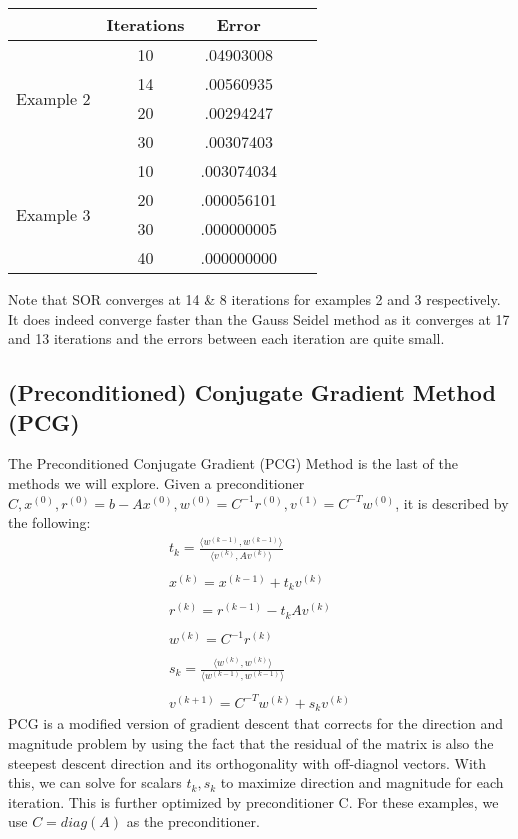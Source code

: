 \documentclass[11pt]{article}	%
\begin{document}
\begin{center}
    \begin{tabular}{||c|c|c|c|c||}
        \hline
        & Iterations & Error \\ [.35em]
        \hline
        \multirow{4}{5em}{Example 2} & 10 & .04903008 \\ [.25em]
        & 14 & .00560935 \\ [.25em]
        & 20 & .00294247 \\ [.25em]
        & 30 & .00307403 \\ [.25em]
        \hline
        \multirow{4}{5em}{Example 3} & 10 & .003074034 \\ [.25em]
        & 20 & .000056101 \\ [.25em]
        & 30 & .000000005 \\ [.25em]
        & 40 & .000000000 \\ [.25em]
        \hline
    \end{tabular}
\end{center}

Note that SOR converges at 14 \& 8 iterations for examples 2 and 3 respectively. It does indeed converge faster than the Gauss Seidel method as it converges at 17 and 13 iterations and the errors between each iteration are quite small.

\subsection{(Preconditioned) Conjugate Gradient Method (PCG)}
The Preconditioned Conjugate Gradient (PCG) Method is the last of the methods we will explore. Given a preconditioner $C, x^{(0)}, r^{(0)} = b - Ax^{(0)}, w^{(0)} = C^{-1}r^{(0)}, v^{(1)} = C^{-T}w^{(0)}$, it is described by the following:
\begin{align*}\label{eq:precondition-conj-grad-eq-1}
    t_k = \frac{\langle w^{(k-1)}, w^{(k-1)}\rangle}{\langle v^{(k)}, Av^{(k)}\rangle} \\\\
    x^{(k)} = x^{(k-1)} + t_kv^{(k)} \\\\
    r^{(k)} = r^{(k-1)} - t_kAv^{(k)} \\\\
    w^{(k)} = C^{-1}r^{(k)} \\\\
    s_k = \frac{\langle w^{(k)}, w^{(k)}\rangle}{\langle w^{(k-1)}, w^{(k-1)}\rangle} \\\\
    v^{(k+1)} = C^{-T}w^{(k)} + s_kv^{(k)}
\end{align*}
PCG is a modified version of gradient descent that corrects for the direction and magnitude problem by using the fact that the residual of the matrix is also the steepest descent direction and its orthogonality with off-diagnol vectors. With this, we can solve for scalars $t_k, s_k$ to maximize direction and magnitude for each iteration. This is further optimized by preconditioner C. For these examples, we use $ C = diag(A) $ as the preconditioner.
\end{document}

